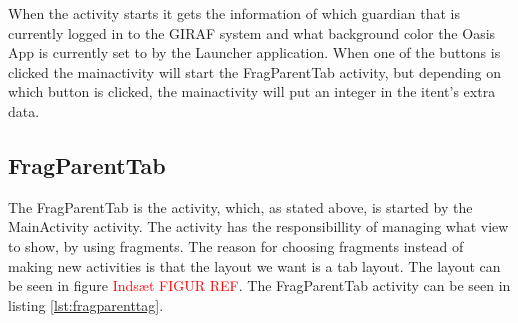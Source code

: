 When the activity starts it gets the information of which guardian that is currently logged in to the GIRAF system and what background color the Oasis App is currently set to by the Launcher application. When one of the buttons is clicked the mainactivity will start the FragParentTab activity, but depending on which button is clicked, the mainactivity will put an integer in the itent's extra data.

\subsection{FragParentTab}
The FragParentTab is the activity, which, as stated above, is started by the MainActivity activity. The activity has the responsibillity of managing what view to show, by using fragments. The reason for choosing fragments instead of making new activities is that the layout we want is a tab layout. The layout can be seen in figure \textcolor{red}{Inds\ae{}t FIGUR REF}. The FragParentTab activity can be seen in listing \vref{lst:fragparenttag}.

